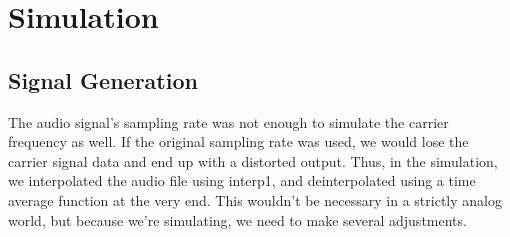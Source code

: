 \section{Simulation}

\subsection{Signal Generation}
    The audio signal's sampling rate was not enough to simulate the carrier frequency as well. If the original sampling rate was used, we would lose the carrier signal data and end up with a distorted output. Thus, in the simulation, we interpolated the audio file using interp1, and deinterpolated using a time average function at the very end. This wouldn't be necessary in a strictly analog world, but because we're simulating, we need to make several adjustments.

